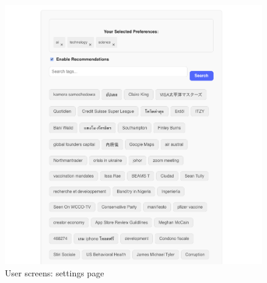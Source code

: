\begin{figure}[!h]
    \hfil
    \begin{minipage}{0.48\linewidth}
        \centering
        \includegraphics[width=1.2\textwidth]{chapters/chapter_03/page/user/settings-page}
        \caption{User screens: settings page}
        \label{fig:settings-wireframes}
    \end{minipage}
\end{figure}


